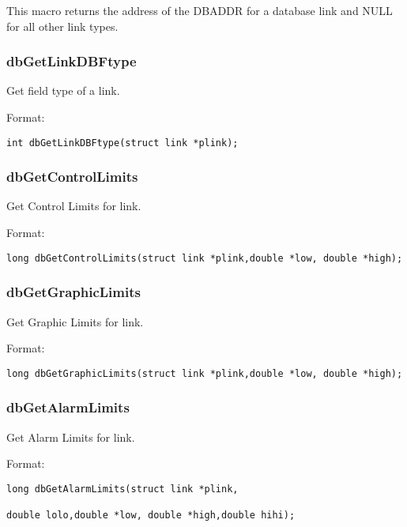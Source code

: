 This macro returns the address of the DBADDR for a database link and NULL for all other link types.

\subsubsection{dbGetLinkDBFtype}

Get field type of a link.

Format:

\begin{verbatim}
int dbGetLinkDBFtype(struct link *plink);
\end{verbatim}

\subsubsection{dbGetControlLimits}

Get Control Limits for link.

Format:

\begin{verbatim}
long dbGetControlLimits(struct link *plink,double *low, double *high);
\end{verbatim}

\subsubsection{dbGetGraphicLimits}

Get Graphic Limits for link.

Format:

\begin{verbatim}
long dbGetGraphicLimits(struct link *plink,double *low, double *high);
\end{verbatim}

\subsubsection{dbGetAlarmLimits}

Get Alarm Limits for link.

Format:

\begin{verbatim}
long dbGetAlarmLimits(struct link *plink,

double lolo,double *low, double *high,double hihi);
\end{verbatim}

